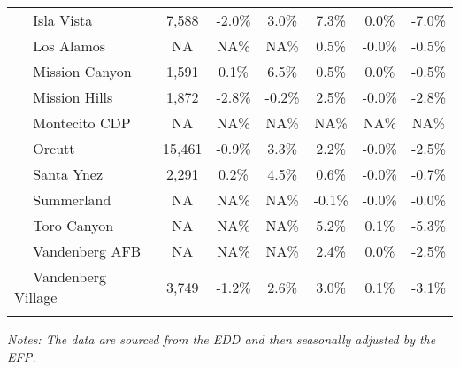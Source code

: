 \documentclass[12pt]{article}
\begin{document}
\begin{landscape}
\begin{table}
\begin{tabular}{|l|c|c|c||c|c|c|}
$\quad$ Isla Vista & 7,588 & -2.0\% & 3.0\% & 7.3\% & 0.0\% & -7.0\% \\
$\quad$ Los Alamos & NA & NA\% & NA\% & 0.5\% & -0.0\% & -0.5\% \\
$\quad$ Mission Canyon & 1,591 & 0.1\% & 6.5\% & 0.5\% & 0.0\% & -0.5\% \\
$\quad$ Mission Hills & 1,872 & -2.8\% & -0.2\% & 2.5\% & -0.0\% & -2.8\% \\
$\quad$ Montecito CDP & NA & NA\% & NA\% & NA\% & NA\% & NA\% \\
$\quad$ Orcutt & 15,461 & -0.9\% & 3.3\% & 2.2\% & -0.0\% & -2.5\% \\
$\quad$ Santa Ynez & 2,291 & 0.2\% & 4.5\% & 0.6\% & -0.0\% & -0.7\% \\
$\quad$ Summerland & NA & NA\% & NA\% & -0.1\% & -0.0\% & -0.0\% \\
$\quad$ Toro Canyon & NA & NA\% & NA\% & 5.2\% & 0.1\% & -5.3\% \\
$\quad$ Vandenberg AFB & NA & NA\% & NA\% & 2.4\% & 0.0\% & -2.5\% \\
$\quad$ Vandenberg Village & 3,749 & -1.2\% & 2.6\% & 3.0\% & 0.1\% & -3.1\% \\
&&&&&& \\ \hline \hline
\end{tabular}
\par
\vspace{.5em}
\footnotesize
\textit{Notes: The data are sourced from the EDD and then seasonally adjusted by the EFP.}
\end{table}
\end{landscape}
\end{document}

